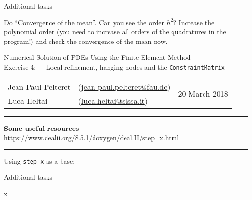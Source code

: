\documentclass[11pt,answers]{exam}
\makeatletter
\newcommand{\makeheader}[3]{%
\setcounter{question}{0}
\begin{center}
{\sc Numerical Solution of PDEs Using the Finite Element Method}\vspace{2ex}\\
{\sc Exercise #1:\ \ \ #2}\vspace{2ex}\\
\begin{tabular*}{\textwidth}{ll @{\extracolsep{\fill}}r}
Jean-Paul Pelteret & (\url{jean-paul.pelteret@fau.de}) & \multirow{2}{*}{#3} \\
Luca Heltai & (\url{luca.heltai@sissa.it}) & \\
\end{tabular*}
\end{center}
}
\newcommand{\makeresources}[1]{%
\rule{\textwidth}{0.6mm}
\textbf{Some useful resources}\\[1.5ex]
#1 \\
\rule{\textwidth}{0.6mm}
}
\makeatother
\begin{document}
\begin{questions}

\question Additional tasks
\begin{parts}
\bonuspart Do ``Convergence of the mean''. Can you see the order $h^{2}$? 
\bonuspart Increase the polynomial order (you need to increase all orders of the quadratures in the program!) and check the convergence of the mean now.
\end{parts}

\end{questions}




\clearpage
\makeheader{4}{Local refinement, hanging nodes and the \texttt{ConstraintMatrix}}{20 March 2018}
\makeresources{%
\url{https://www.dealii.org/8.5.1/doxygen/deal.II/step_x.html}
}

\begin{questions}

\question Using \verb|step-x| as a base:

\question Additional tasks
\begin{parts}
\bonuspart x
\end{parts}

\end{questions}
\end{document}
